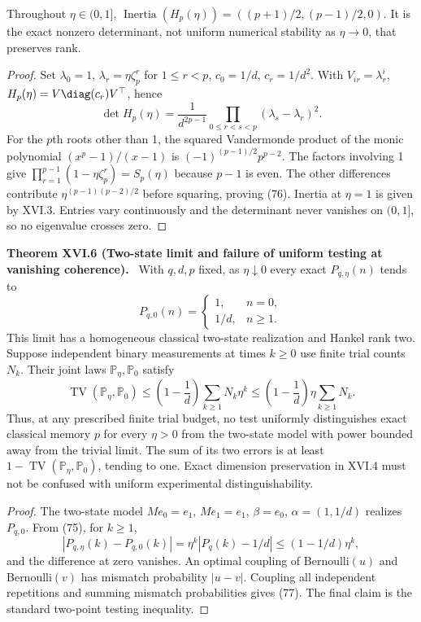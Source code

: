 \documentclass[11pt,a4paper,oneside]{book}
\newcommand{\statement}[3]{\par\medskip\noindent\textbf{#1 #2 (#3).}\ }
\begin{document}
Throughout $\eta\in(0,1]$, $\operatorname{Inertia}(H_p(\eta))=((p+1)/2,(p-1)/2,0)$. It is the exact nonzero determinant, not uniform numerical stability as $\eta\to0$, that preserves rank.
\begin{proof}Set $\lambda_0=1$, $\lambda_r=\eta\zeta_p^r$ for $1\le r<p$, $c_0=1/d$, $c_r=1/d^2$. With $V_{ir}=\lambda_r^i$, $H_p(\eta)=V\diag(c_r)V^\top$, hence
\[\det H_p(\eta)=\frac1{d^{2p-1}}\prod_{0\le r<s<p}(\lambda_s-\lambda_r)^2.\]
For the $p$th roots other than 1, the squared Vandermonde product of the monic polynomial $(x^p-1)/(x-1)$ is $(-1)^{(p-1)/2}p^{p-2}$. The factors involving 1 give $\prod_{r=1}^{p-1}(1-\eta\zeta_p^r)=S_p(\eta)$ because $p-1$ is even. The other differences contribute $\eta^{(p-1)(p-2)/2}$ before squaring, proving (76). Inertia at $\eta=1$ is given by XVI.3. Entries vary continuously and the determinant never vanishes on $(0,1]$, so no eigenvalue crosses zero.\end{proof}
\statement{Theorem}{XVI.6}{Two-state limit and failure of uniform testing at vanishing coherence} With $q,d,p$ fixed, as $\eta\downarrow0$ every exact $P_{q,\eta}(n)$ tends to
\[P_{q,0}(n)=\begin{cases}1,&n=0,\\1/d,&n\ge1.\end{cases}\]
This limit has a homogeneous classical two-state realization and Hankel rank two. Suppose independent binary measurements at times $k\ge0$ use finite trial counts $N_k$. Their joint laws $\mathbb P_\eta,\mathbb P_0$ satisfy
\begin{equation}\operatorname{TV}(\mathbb P_\eta,\mathbb P_0)\le\left(1-\frac1d\right)\sum_{k\ge1}N_k\eta^k\le\left(1-\frac1d\right)\eta\sum_{k\ge1}N_k.\tag{77}\end{equation}
Thus, at any prescribed finite trial budget, no test uniformly distinguishes exact classical memory $p$ for every $\eta>0$ from the two-state model with power bounded away from the trivial limit. The sum of its two errors is at least $1-\operatorname{TV}(\mathbb P_\eta,\mathbb P_0)$, tending to one. Exact dimension preservation in XVI.4 must not be confused with uniform experimental distinguishability.
\begin{proof}The two-state model $Me_0=e_1$, $Me_1=e_1$, $\beta=e_0$, $\alpha=(1,1/d)$ realizes $P_{q,0}$. From (75), for $k\ge1$,
\[|P_{q,\eta}(k)-P_{q,0}(k)|=\eta^k|P_q(k)-1/d|\le(1-1/d)\eta^k,\]
and the difference at zero vanishes. An optimal coupling of Bernoulli$(u)$ and Bernoulli$(v)$ has mismatch probability $|u-v|$. Coupling all independent repetitions and summing mismatch probabilities gives (77). The final claim is the standard two-point testing inequality.\end{proof}
\end{document}
